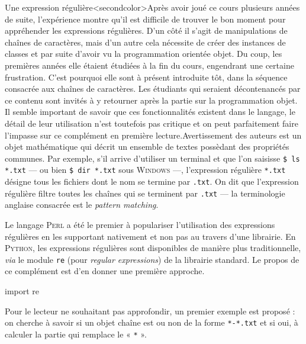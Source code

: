 Une expression régulière\caution[t]<secondcolor>{Après avoir joué ce cours plusieurs années de suite, l'expérience montre qu'il est difficile de trouver le bon moment pour appréhender les expressions régulières.
D'un côté il s'agit de manipulations de chaînes de caractères, mais d'un autre cela nécessite de créer des instances de classes et par suite d'avoir vu la programmation orientée objet. Du coup, les premières années elle étaient étudiées à la fin du cours, engendrant une certaine frustration.
C'est pourquoi elle sont à présent introduite tôt, dans la séquence consacrée aux chaînes de caractères. Les étudiants qui seraient décontenancés par ce contenu sont invités à y retourner après la partie sur la programmation objet.
Il semble important de savoir que ces fonctionnalités existent dans le langage, le détail de leur utilisation n'est toutefois pas critique et on peut parfaitement faire l'impasse sur ce complément en première lecture.}{Avertissement des auteurs}
 est un objet mathématique qui décrit un ensemble de textes possèdant des propriétés communes. Par exemple, s'il arrive d'utiliser un terminal et que l'on saisisse \texttt{\$ ls *.txt} --- ou bien \texttt{\$ dir *.txt} sous \textsc{Windows} ---, l'expression régulière \texttt{*.txt} désigne tous les fichiers dont le nom se termine par \texttt{.txt}. On dit que l'expression régulière filtre toutes les chaînes qui se terminent par \texttt{.txt} --- la terminologie anglaise consacrée est le \textit{pattern matching}.

Le langage \textsc{Perl} a été le premier à populariser l'utilisation des expressions régulières en les supportant nativement et non pas au travers d'une librairie. En \textsc{Python}, les expressions régulières sont disponibles de manière plus traditionnelle, \textit{via} le module \texttt{re} (pour \textit{regular expressions}) de la librairie standard. Le propos de ce complément est d'en donner une première approche.

\begin{idleconsole}
	\begin{pyconsole}
		import re
	\end{pyconsole}
\end{idleconsole}


Pour le lecteur ne souhaitant pas approfondir, un premier exemple est proposé : on cherche à savoir si un objet chaîne est ou non de la forme \texttt{*-*.txt} et si oui, à calculer la partie qui remplace le « \texttt{*} ».

